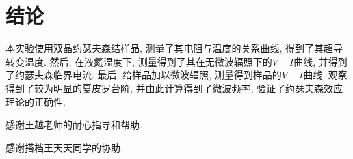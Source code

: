 \documentclass[font=default]{mpltx}
\newcommand{\note}[1]{{\color{gray}#1}}
\newcommand*\cs[1]{\texttt{\textbackslash #1}}
\newcommand*\env[1]{\textit{\texttt{#1}}}
\newcommand*\file[1]{\textbf{\texttt{#1}}}
\begin{document}





\section{结论}
本实验使用双晶约瑟夫森结样品, 测量了其电阻与温度的关系曲线, 得到了其超导转变温度. 然后, 在液氮温度下, 测量得到了其在无微波辐照下的$V-I$曲线,
并得到了约瑟夫森临界电流. 最后, 给样品加以微波辐照, 测量得到样品的$V-I$曲线, 观察得到了较为明显的夏皮罗台阶, 并由此计算得到了微波频率, 验证了约瑟夫森效应理论的正确性.


\begin{acknowledgments}
  感谢王越老师的耐心指导和帮助.
  \par
  感谢搭档王天天同学的协助.
\end{acknowledgments}
\end{document}

